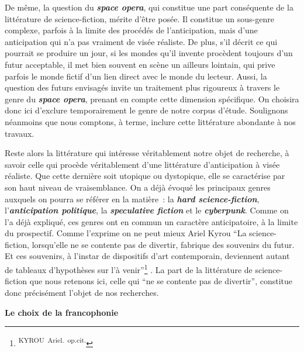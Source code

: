 \documentclass[letterpaper,portrait,12pt]{article}
\begin{document}
	De m\^{e}me, la question du \textbf{\emph{space opera}}, qui constitue une part cons\'{e}quente de la litt\'{e}rature de science-fiction, m\'{e}rite d'\^{e}tre pos\'{e}e. Il constitue un sous-genre complexe, parfois \`{a} la limite des proc\'{e}d\'{e}s de l'anticipation, mais d'une anticipation qui n'a pas vraiment de vis\'{e}e r\'{e}aliste. De plus, s'il d\'{e}crit ce qui pourrait se produire un jour, si les mondes qu'il invente proc\`{e}dent toujours d'un futur acceptable, il met bien souvent en sc\`{e}ne un ailleurs lointain, qui prive parfois le monde fictif d'un lien direct avec le monde du lecteur. Aussi, la question des futurs envisag\'{e}s invite un traitement plus rigoureux \`{a} travers le genre du \textbf{\emph{space opera}}, prenant en compte cette dimension sp\'{e}cifique. On choisira donc ici d'exclure temporairement le genre de notre corpus d'\'{e}tude. Soulignons n\'{e}anmoins que nous comptons, \`{a} terme, inclure cette litt\'{e}rature abondante \`{a} nos travaux. 





	Reste alors la litt\'{e}rature qui int\'{e}resse v\'{e}ritablement notre objet de recherche, \`{a} savoir celle qui proc\`{e}de v\'{e}ritablement d'une litt\'{e}rature d'anticipation \`{a} vis\'{e}e r\'{e}aliste. Que cette derni\`{e}re soit utopique ou dystopique, elle se caract\'{e}rise par son haut niveau de vraisemblance. On a d\'{e}j\`{a} \'{e}voqu\'{e} les principaux genres auxquels on pourra se r\'{e}f\'{e}rer en la mati\`{e}re : la \textbf{\emph{hard science-fiction}}, l'\textbf{\emph{anticipation politique}}, la\textbf{\emph{ speculative fiction}} et le\textbf{\emph{ cyberpunk}}. Comme on l'a d\'{e}j\`{a} expliqu\'{e}, ces genres ont en commun un caract\`{e}re anticipatoire, \`{a} la limite du prospectif. Comme l'exprime on ne peut mieux Ariel Kyrou {``}La science-fiction, lorsqu'elle ne se contente pas de divertir, fabrique des souvenirs du futur. Et ces souvenirs, \`{a} l'instar de dispositifs d'art contemporain, deviennent autant de tableaux d'hypoth\`{e}ses sur l'\`{a} venir''\footnote{\textsuperscript{\newpage
}\textsuperscript{	KYROU\ Ariel.\ op.cit.}} . La part de la litt\'{e}rature de science-fiction que nous retenons ici, celle qui {``}ne se contente pas de divertir'', constitue donc pr\'{e}cis\'{e}ment l'objet de nos recherches.








	\textbf{Le choix de la francophonie}
\end{document}
